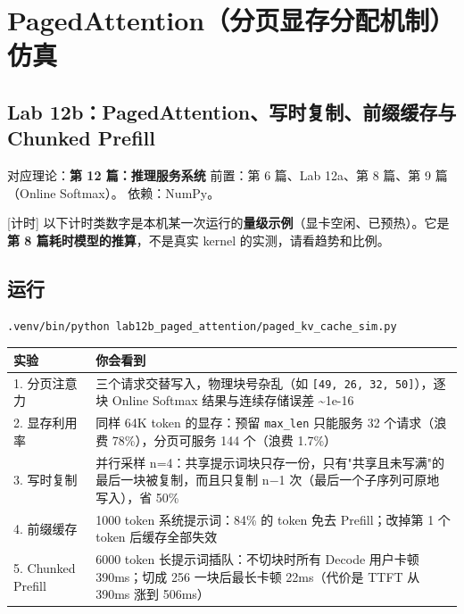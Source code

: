 \chapter{PagedAttention（分页显存分配机制）仿真}

\section{Lab 12b：PagedAttention、写时复制、前缀缓存与 Chunked Prefill}

\begin{noteBox}[核心导读与背景]
对应理论：\textbf{第 12 篇：推理服务系统}
前置：第 6 篇、Lab 12a、第 8 篇、第 9 篇（Online Softmax）。
依赖：NumPy。
\end{noteBox}

\begin{noteBox}[核心导读与背景]
{}[计时] 以下计时类数字是本机某一次运行的\textbf{量级示例}（显卡空闲、已预热）。它是\textbf{第 8 篇耗时模型的推算}，不是真实 kernel 的实测，请看趋势和比例。
\end{noteBox}

\section{运行}

\begin{lstlisting}[language=bash]
.venv/bin/python lab12b_paged_attention/paged_kv_cache_sim.py
\end{lstlisting}

\begin{center}
\small
\begin{tabularx}{\textwidth}{p{3.5cm} X}
\toprule
\textbf{实验} & \textbf{你会看到} \\
\midrule
1. 分页注意力 & 三个请求交替写入，物理块号杂乱（如 \texttt{[49, 26, 32, 50]}），逐块 Online Softmax 结果与连续存储误差 \textasciitilde{}1e-16 \\
2. 显存利用率 & 同样 64K token 的显存：预留 \texttt{max\_len} 只能服务 32 个请求（浪费 78\%），分页可服务 144 个（浪费 1.7\%） \\
3. 写时复制 & 并行采样 n=4：共享提示词块只存一份，只有"共享且未写满"的最后一块被复制，而且只复制 n−1 次（最后一个子序列可原地写入），省 50\% \\
4. 前缀缓存 & 1000 token 系统提示词：84\% 的 token 免去 Prefill；改掉第 1 个 token 后缓存全部失效 \\
5. Chunked Prefill & 6000 token 长提示词插队：不切块时所有 Decode 用户卡顿 390ms；切成 256 一块后最长卡顿 22ms（代价是 TTFT 从 390ms 涨到 506ms） \\
\bottomrule
\end{tabularx}
\end{center}

